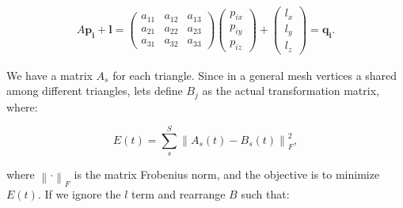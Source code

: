 \documentclass[12pt]{article}
\begin{document}
\begin{align*}
A \mathbf{p_i} + \mathbf{l} = \begin{pmatrix}
 a_{11} & a_{12} & a_{13} \\ 
 a_{21} & a_{22} & a_{23} \\ 
 a_{31} & a_{32}  & a_{33} 
\end{pmatrix} 
\begin{pmatrix}
 p_{ix} \\ 
 p_{iy} \\ 
 p_{iz} 
\end{pmatrix} +
\begin{pmatrix}
 l_x \\ 
 l_y \\ 
 l_z
\end{pmatrix} = \mathbf{q_i}.
\end{align*}

We have a matrix $A_{s}$ for each triangle.
Since in a general mesh vertices a shared among different triangles, lets define $B_{j}$ as the actual transformation matrix, where:

\begin{equation*}
E(t) = \sum_{s}^S \left \| A_s(t) - B_s(t) \right \|^2_F,
\end{equation*}

where $\left \| \cdot \right \|_F$ is the matrix Frobenius norm, and the objective is to minimize $E(t)$.
If we ignore the $l$ term and rearrange $B$ such that:
\end{document}

